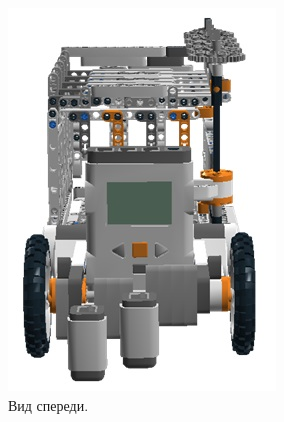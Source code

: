 \begin{figure}[h!]
	\begin{minipage}[h!]{0.5\linewidth}
		\begin{center}
			\includegraphics[width=1\linewidth]{chapters/chapter27/images/4}
			\caption{Вид спереди.}
			\label{ris:image27x4}
		\end{center}
	\end{minipage}
	\begin{minipage}[h!]{0.5\linewidth}
		\begin{center}

\end{center}
\end{minipage}
\end{figure}
